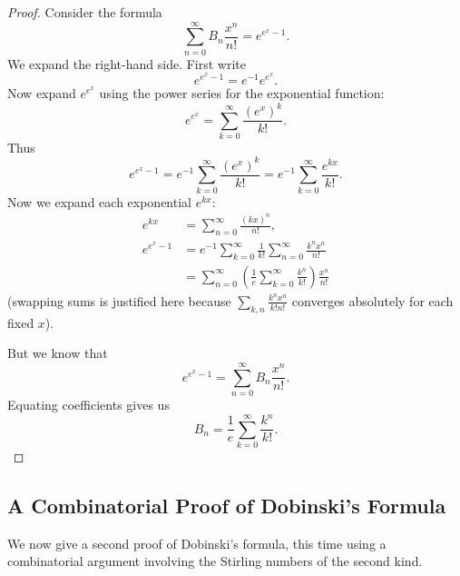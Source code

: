 \documentclass[12pt]{amsart}
\theoremstyle{plain}
\theoremstyle{definition}
\theoremstyle{remark}
\begin{document}
\begin{proof}
Consider the formula
$$\sum_{n = 0}^\infty B_n\frac{x^n}{n!} = e^{e^x - 1}.$$
We expand the right-hand side. First write
$$e^{e^x - 1} = e^{-1}e^{e^x}.$$
Now expand $e^{e^x}$ using the power series for the exponential function:
$$e^{e^x} = \sum_{k = 0}^\infty \frac{(e^x)^k}{k!}.$$
Thus
$$e^{e^x - 1} = e^{-1}\sum_{k = 0}^\infty \frac{(e^x)^k}{k!} = e^{-1}\sum_{k = 0}^\infty \frac{e^{kx}}{k!}.$$
Now we expand each exponential $e^{kx}$:
\begin{align*}
e^{kx} &= \sum_{n = 0}^\infty \frac{(kx)^n}{n!},\\
e^{e^x - 1} &= e^{-1}\sum_{k = 0}^\infty \frac{1}{k!}\sum_{n = 0}^\infty \frac{k^nx^n}{n!}\\
&= \sum_{n = 0}^\infty \left(\frac{1}{e} \sum_{k = 0}^\infty \frac{k^n}{k!}\right) \frac{x^n}{n!}
\end{align*}
(swapping sums is justified here because $\sum_{k, n}\frac{k^nx^n}{k!n!}$ converges absolutely for each fixed $x$).

But we know that
$$e^{e^x - 1} = \sum_{n = 0}^\infty B_n \frac{x^n}{n!}.$$
Equating coefficients gives us
$$B_n = \frac{1}{e} \sum_{k = 0}^\infty \frac{k^n}{k!}.$$
\end{proof}

\subsection{A Combinatorial Proof of Dobinski's Formula}

We now give a second proof of Dobinski's formula, this time using a combinatorial argument involving the Stirling numbers of the second kind.
\end{document}
